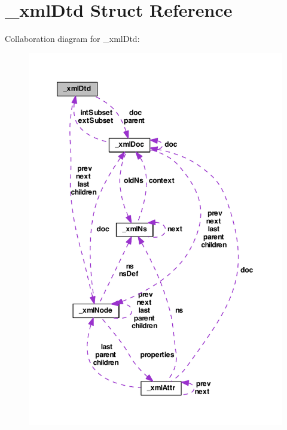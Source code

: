 \hypertarget{struct__xml_dtd}{\section{\-\_\-xml\-Dtd Struct Reference}
\label{struct__xml_dtd}
}


Collaboration diagram for \-\_\-xml\-Dtd\-:
\nopagebreak
\begin{figure}[H]
\begin{center}
\leavevmode
\includegraphics[width=350pt]{struct__xml_dtd__coll__graph}
\end{center}
\end{figure}
